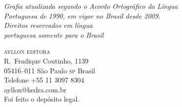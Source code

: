 \bigskip
\textit{Grafia atualizada segundo o Acordo Ortográfico da Língua\\
Portuguesa de 1990, em vigor no Brasil desde 2009.}\\

\vfill
\textit{Direitos reservados em língua\\ 
portuguesa somente para o Brasil}\\\medskip

\textsc{ayllon editora}\\
R.~Fradique Coutinho, 1139\\
05416--011 São Paulo \textsc{sp} Brasil\\
Telefone +55 11 3097 8304\\\smallskip
ayllon@hedra.com.br\\
\bigskip
Foi feito o depósito legal.

\endgroup
\pagebreak